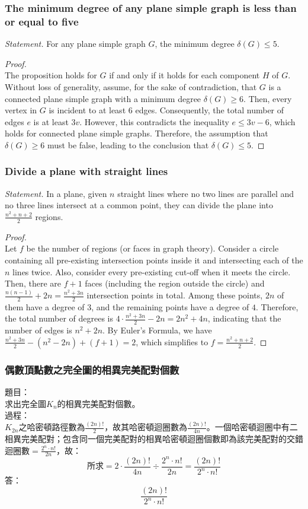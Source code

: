 \documentclass[a4paper,12pt]{report}
\begin{document}
\subsubsection{The minimum degree of any plane simple graph is less than or equal to five}
\textit{Statement. }For any plane simple graph \(G\), the minimum degree \(\delta(G) \leq 5\).
\begin{proof}\mbox{}\\
The proposition holds for \(G\) if and only if it holds for each component \(H\) of \(G\). Without loss of generality, assume, for the sake of contradiction, that \(G\) is a connected plane simple graph with a minimum degree \(\delta(G) \geq 6\). Then, every vertex in \(G\) is incident to at least \(6\) edges. Consequently, the total number of edges \(e\) is at least \(3v\). However, this contradicts the inequality \(e \leq 3v - 6\), which holds for connected plane simple graphs. Therefore, the assumption that \(\delta(G) \geq 6\) must be false, leading to the conclusion that \(\delta(G) \leq 5\).
\end{proof}
\subsubsection{Divide a plane with straight lines}
\textit{Statement. }In a plane, given $n$ straight lines where no two lines are parallel and no three lines intersect at a common point, they can divide the plane into \(\frac{n^2 + n + 2}{2}\) regions.
\begin{proof}\mbox{}\\
Let \(f\) be the number of regions (or faces in graph theory). Consider a circle containing all pre-existing intersection points inside it and intersecting each of the $n$ lines twice. Also, consider every pre-existing cut-off when it meets the circle. Then, there are \(f + 1\) faces (including the region outside the circle) and \(\frac{n(n-1)}{2} + 2n = \frac{n^2 + 3n}{2}\) intersection points in total. Among these points, \(2n\) of them have a degree of $3$, and the remaining points have a degree of $4$. Therefore, the total number of degrees is \(4 \cdot \frac{n^2 + 3n}{2} - 2n = 2n^2 + 4n\), indicating that the number of edges is \(n^2 + 2n\). By Euler's Formula, we have \(\frac{n^2 + 3n}{2} - (n^2 - 2n) + (f + 1) = 2\), which simplifies to \(f = \frac{n^2 + n + 2}{2}\).
\end{proof}
\subsubsection{偶數頂點數之完全圖的相異完美配對個數}
題目：\\
求出完全圖$K_n$的相異完美配對個數。\\
過程：\\
$K_{2n}$之哈密頓路徑數為$\frac{(2n)!}{2}$，故其哈密頓迴圈數為$\frac{(2n)!}{4n}$。一個哈密頓迴圈中有二相異完美配對；包含同一個完美配對的相異哈密頓迴圈個數即為該完美配對的交錯迴圈數$=\frac{2^n\cdot n!}{2n}$，故：
\[\text{所求}=2\cdot\frac{(2n)!}{4n}\div\frac{2^n\cdot n!}{2n}=\frac{(2n)!}{2^n\cdot n!}\]
答：
\[\frac{(2n)!}{2^n\cdot n!}\]
\end{document}
